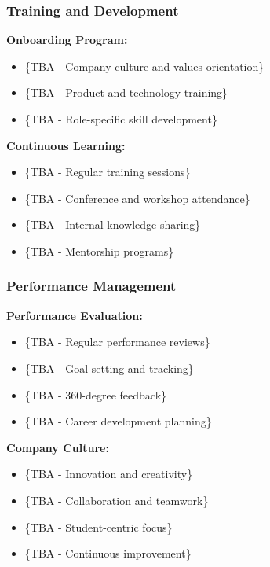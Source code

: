 \subsubsection{Training and Development}
\textbf{Onboarding Program:}
\begin{itemize}
    \item \{TBA - Company culture and values orientation\}
    \item \{TBA - Product and technology training\}
    \item \{TBA - Role-specific skill development\}
\end{itemize}

\textbf{Continuous Learning:}
\begin{itemize}
    \item \{TBA - Regular training sessions\}
    \item \{TBA - Conference and workshop attendance\}
    \item \{TBA - Internal knowledge sharing\}
    \item \{TBA - Mentorship programs\}
\end{itemize}

\subsubsection{Performance Management}
\textbf{Performance Evaluation:}
\begin{itemize}
    \item \{TBA - Regular performance reviews\}
    \item \{TBA - Goal setting and tracking\}
    \item \{TBA - 360-degree feedback\}
    \item \{TBA - Career development planning\}
\end{itemize}

\textbf{Company Culture:}
\begin{itemize}
    \item \{TBA - Innovation and creativity\}
    \item \{TBA - Collaboration and teamwork\}
    \item \{TBA - Student-centric focus\}
    \item \{TBA - Continuous improvement\}
\end{itemize}